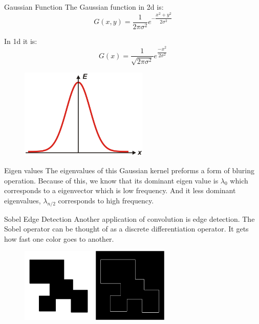 \documentclass{beamer}
\begin{document}
\begin{frame}{Gaussian Function}
The Gaussian function in 2d is:
$$G(x,y) = \dfrac{1}{2\pi \sigma^2}e^{-\dfrac{x^2+y^2}{2 \sigma^2}}$$

In 1d it is:
$$ G(x) = \dfrac{1}{\sqrt{2\pi \sigma^2}}e^{\dfrac{-x^2}{2\sigma^2}}$$

\begin{figure}[ht]
\includegraphics[width=2.4in]{gauss.png}
\end{figure}
\end{frame}


\begin{frame} {Eigen values}
The eigenvalues of this Gaussian kernel preforms a form of bluring operation. Because of this, we know that its dominant eigen value is $\lambda_0$ which corresponds to a eigenvector which is low frequency. And it less dominant eigenvalues, $\lambda_{n/2}$ corresponds to high frequency.
\end{frame}


\begin{frame}{Sobel Edge Detection}
Another application of convolution is edge detection. The Sobel operator can be thought of as a discrete differentiation operator. It gets how fast one color goes to another. 

\begin{figure}[ht]
\includegraphics[width=1.4in]{edgein.png}
\hspace{.1in}
\includegraphics[width=1.4in]{edgeout.jpg}
\hspace{.1in}
\end{figure}
\end{frame}
\end{document}
